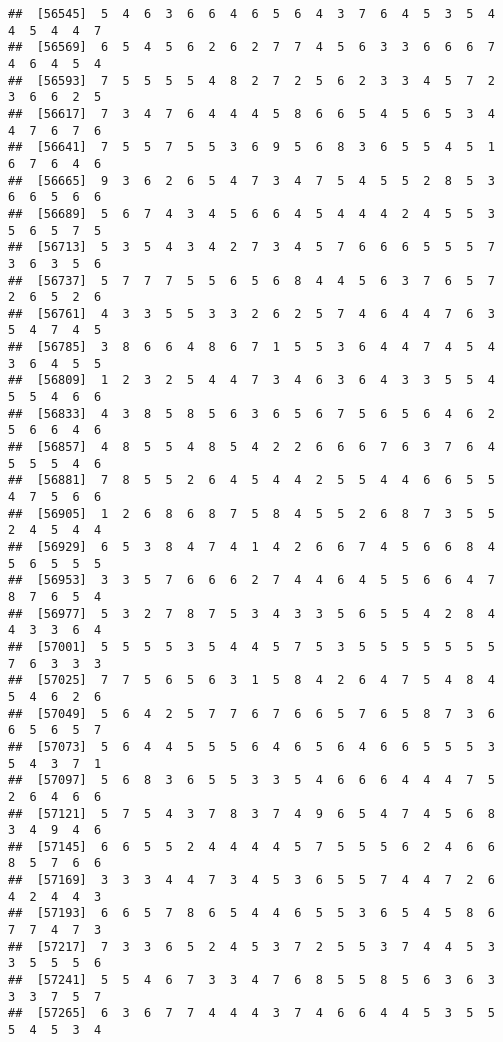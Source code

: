 \documentclass[
]{book}
\begin{document}
\begin{verbatim}
##  [56545]  5  4  6  3  6  6  4  6  5  6  4  3  7  6  4  5  3  5  4  4  5  4  4  7
##  [56569]  6  5  4  5  6  2  6  2  7  7  4  5  6  3  3  6  6  6  7  4  6  4  5  4
##  [56593]  7  5  5  5  5  4  8  2  7  2  5  6  2  3  3  4  5  7  2  3  6  6  2  5
##  [56617]  7  3  4  7  6  4  4  4  5  8  6  6  5  4  5  6  5  3  4  4  7  6  7  6
##  [56641]  7  5  5  7  5  5  3  6  9  5  6  8  3  6  5  5  4  5  1  6  7  6  4  6
##  [56665]  9  3  6  2  6  5  4  7  3  4  7  5  4  5  5  2  8  5  3  6  6  5  6  6
##  [56689]  5  6  7  4  3  4  5  6  6  4  5  4  4  4  2  4  5  5  3  5  6  5  7  5
##  [56713]  5  3  5  4  3  4  2  7  3  4  5  7  6  6  6  5  5  5  7  3  6  3  5  6
##  [56737]  5  7  7  7  5  5  6  5  6  8  4  4  5  6  3  7  6  5  7  2  6  5  2  6
##  [56761]  4  3  3  5  5  3  3  2  6  2  5  7  4  6  4  4  7  6  3  5  4  7  4  5
##  [56785]  3  8  6  6  4  8  6  7  1  5  5  3  6  4  4  7  4  5  4  3  6  4  5  5
##  [56809]  1  2  3  2  5  4  4  7  3  4  6  3  6  4  3  3  5  5  4  5  5  4  6  6
##  [56833]  4  3  8  5  8  5  6  3  6  5  6  7  5  6  5  6  4  6  2  5  6  6  4  6
##  [56857]  4  8  5  5  4  8  5  4  2  2  6  6  6  7  6  3  7  6  4  5  5  5  4  6
##  [56881]  7  8  5  5  2  6  4  5  4  4  2  5  5  4  4  6  6  5  5  4  7  5  6  6
##  [56905]  1  2  6  8  6  8  7  5  8  4  5  5  2  6  8  7  3  5  5  2  4  5  4  4
##  [56929]  6  5  3  8  4  7  4  1  4  2  6  6  7  4  5  6  6  8  4  5  6  5  5  5
##  [56953]  3  3  5  7  6  6  6  2  7  4  4  6  4  5  5  6  6  4  7  8  7  6  5  4
##  [56977]  5  3  2  7  8  7  5  3  4  3  3  5  6  5  5  4  2  8  4  4  3  3  6  4
##  [57001]  5  5  5  5  3  5  4  4  5  7  5  3  5  5  5  5  5  5  5  7  6  3  3  3
##  [57025]  7  7  5  6  5  6  3  1  5  8  4  2  6  4  7  5  4  8  4  5  4  6  2  6
##  [57049]  5  6  4  2  5  7  7  6  7  6  6  5  7  6  5  8  7  3  6  6  5  6  5  7
##  [57073]  5  6  4  4  5  5  5  6  4  6  5  6  4  6  6  5  5  5  3  5  4  3  7  1
##  [57097]  5  6  8  3  6  5  5  3  3  5  4  6  6  6  4  4  4  7  5  2  6  4  6  6
##  [57121]  5  7  5  4  3  7  8  3  7  4  9  6  5  4  7  4  5  6  8  3  4  9  4  6
##  [57145]  6  6  5  5  2  4  4  4  4  5  7  5  5  5  6  2  4  6  6  8  5  7  6  6
##  [57169]  3  3  3  4  4  7  3  4  5  3  6  5  5  7  4  4  7  2  6  4  2  4  4  3
##  [57193]  6  6  5  7  8  6  5  4  4  6  5  5  3  6  5  4  5  8  6  7  7  4  7  3
##  [57217]  7  3  3  6  5  2  4  5  3  7  2  5  5  3  7  4  4  5  3  3  5  5  5  6
##  [57241]  5  5  4  6  7  3  3  4  7  6  8  5  5  8  5  6  3  6  3  3  3  7  5  7
##  [57265]  6  3  6  7  7  4  4  4  3  7  4  6  6  4  4  5  3  5  5  5  4  5  3  4

\end{verbatim}
\end{document}

